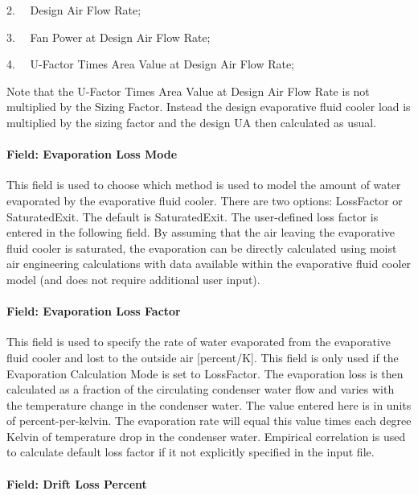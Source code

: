 2.~~ Design Air Flow Rate;

3.~~ Fan Power at Design Air Flow Rate;

4.~~ U-Factor Times Area Value at Design Air Flow Rate;

Note that the U-Factor Times Area Value at Design Air Flow Rate is not multiplied by the Sizing Factor. Instead the design evaporative fluid cooler load is multiplied by the sizing factor and the design UA then calculated as usual.

\paragraph{Field: Evaporation Loss Mode}\label{field-evaporation-loss-mode-4}

This field is used to choose which method is used to model the amount of water evaporated by the evaporative fluid cooler. There are two options: LossFactor or SaturatedExit. The default is SaturatedExit. The user-defined loss factor is entered in the following field. By assuming that the air leaving the evaporative fluid cooler is saturated, the evaporation can be directly calculated using moist air engineering calculations with data available within the evaporative fluid cooler model (and does not require additional user input).

\paragraph{Field: Evaporation Loss Factor}\label{field-evaporation-loss-factor-4}

This field is used to specify the rate of water evaporated from the evaporative fluid cooler and lost to the outside air {[}percent/K{]}. This field is only used if the Evaporation Calculation Mode is set to LossFactor. The evaporation loss is then calculated as a fraction of the circulating condenser water flow and varies with the temperature change in the condenser water. The value entered here is in units of percent-per-kelvin. The evaporation rate will equal this value times each degree Kelvin of temperature drop in the condenser water. Empirical correlation is used to calculate default loss factor if it not explicitly specified in the input file.

\paragraph{Field: Drift Loss Percent}\label{field-drift-loss-percent-4}


